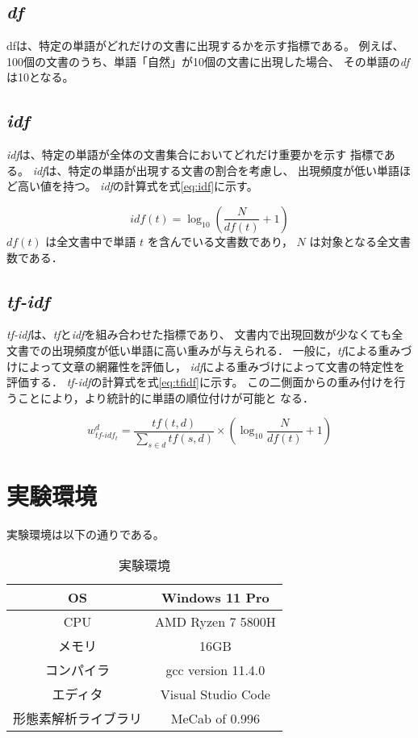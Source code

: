 \documentclass[a4paper,11pt,dvipdfmx]{jsarticle}
\begin{document}
\subsection{\textit{df}}
dfは、特定の単語がどれだけの文書に出現するかを示す指標である。
例えば、100個の文書のうち、単語「自然」が10個の文書に出現した場合、
その単語の\textit{df}は10となる。

\subsection{\textit{idf}}
\textit{idf}は、特定の単語が全体の文書集合においてどれだけ重要かを示す
指標である。
\textit{idf}は、特定の単語が出現する文書の割合を考慮し、
出現頻度が低い単語ほど高い値を持つ。
\textit{idf}の計算式を式\ref{eq:idf}に示す。

\begin{equation}
idf(t) = \log_{10} \left( \frac{N}{df(t)} + 1 \right)
\label{eq:idf}
\end{equation}
\( df(t) \) は全文書中で単語 \( t \) を含んでいる文書数であり，
\( N \) は対象となる全文書数である．

\subsection{\textit{tf-idf}}
\textit{tf-idf}は、\textit{tf}と\textit{idf}を組み合わせた指標であり、
文書内で出現回数が少なくても全文書での出現頻度が低い単語に高い重みが与えられる．
一般に，\textit{tf}による重みづけによって文章の網羅性を評価し，
\textit{idf}による重みづけによって文書の特定性を評価する．
\textit{tf-idf}の計算式を式\ref{eq:tfidf}に示す。
この二側面からの重み付けを行うことにより，より統計的に単語の順位付けが可能と
なる．

\begin{equation}
  w_{tf\text{-}idf_t}^d = \frac{tf(t, d)}{\sum_{s \in d} tf(s, d)} \times \left( \log_{10} \frac{N}{df(t)} + 1 \right)
\label{eq:tfidf}
\end{equation}

\section{実験環境}
実験環境は以下の通りである。

\begin{table}[H]
\centering
\caption{実験環境}
\label{table:environment}
\begin{tabular}{|c|c|}
\hline
OS    & Windows 11 Pro   \\
\hline
CPU   & AMD Ryzen 7 5800H \\
\hline
メモリ & 16GB              \\
\hline
コンパイラ & gcc version 11.4.0 \\
\hline
エディタ & Visual Studio Code  \\
\hline
形態素解析ライブラリ & MeCab of 0.996  \\
\hline
\end{tabular}
\end{table}
\end{document}
